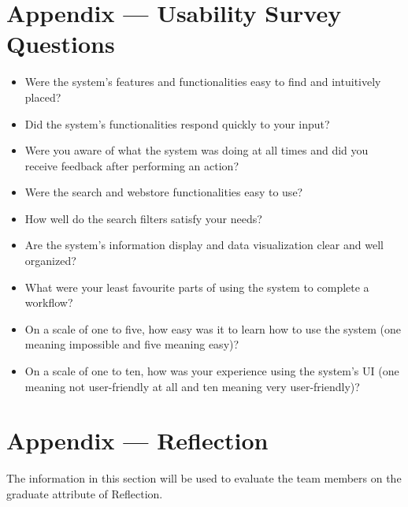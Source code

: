 \documentclass[12pt, titlepage]{article}
\begin{document}



\newpage{}

\section*{Appendix --- Usability Survey Questions}

\begin{itemize}
  \item{Were the system's features and functionalities easy to find and intuitively placed?}
  \item{Did the system's functionalities respond quickly to your input?}
  \item{Were you aware of what the system was doing at all times and did you receive feedback after performing an action?}
  \item{Were the search and webstore functionalities easy to use?}
  \item{How well do the search filters satisfy your needs?}
  \item{Are the system's information display and data visualization clear and well organized?}
  \item{What were your least favourite parts of using the system to complete a workflow?}
  \item{On a scale of one to five, how easy was it to learn how to use the system (one meaning impossible and five meaning easy)?}
  \item{On a scale of one to ten, how was your experience using the system's UI (one meaning not user-friendly at all and ten meaning very 
  user-friendly)?}
\end{itemize}

\newpage{}

\section*{Appendix --- Reflection}

The information in this section will be used to evaluate the team members on the
graduate attribute of Reflection.


\end{document}

